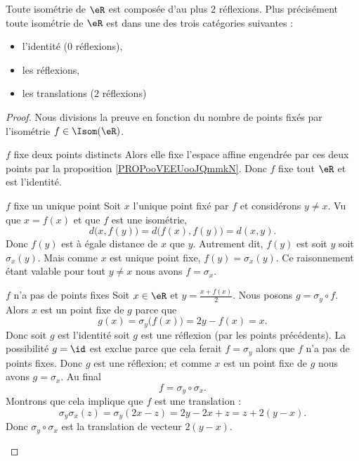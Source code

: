 \begin{theorem}
    Toute isométrie de \( \eR\) est composée d'au plus \( 2\) réflexions. Plus précisément toute isométrie de \( \eR\) est dans une des trois catégories suivantes :
    \begin{itemize}
        \item l'identité (\( 0\) réflexions),
        \item les réflexions,
        \item les translations (\( 2\) réflexions)
    \end{itemize}
\end{theorem}

\begin{proof}
    Nous divisions la preuve en fonction du nombre de points fixés par l'isométrie \( f\in\Isom(\eR)\).
    \begin{subproof}
        \item[\( f\) fixe deux points distincts]
            Alors elle fixe l'espace affine engendrée par ces deux points par la proposition \ref{PROPooVEEUooJQmmkN}. Donc \( f\) fixe tout \( \eR\) et est l'identité.
        \item[\( f\) fixe un unique point]
            Soit \( x\) l'unique point fixé par \( f\) et considérons \( y\neq x\). Vu que \( x=f(x)\) et que \( f\) est une isométrie,
            \begin{equation}
                d\big( x,f(y) \big)=d\big( f(x),f(y) \big)=d(x,y).
            \end{equation}
            Donc \( f(y)\) est à égale distance de \( x\) que \( y\). Autrement dit, \( f(y)\) est soit \( y\) soit \( \sigma_x(y)\). Mais comme \( x\) est unique point fixe, \( f(y)=\sigma_x(y)\). Ce raisonnement étant valable pour tout \( y\neq x  \) nous avons \( f=\sigma_x\).
        \item[\( f\) n'a pas de points fixes]
            Soit \( x\in \eR\) et \( y=\frac{ x+f(x) }{ 2 }\). Nous posons \( g=\sigma_y\circ f\). Alors \( x\) est un point fixe de \( g\) parce que
            \begin{equation}
                g(x)=\sigma_y\big( f(x) \big)=2y-f(x)=x.
            \end{equation}
            Donc soit \( g\) est l'identité soit \( g\) est une réflexion (par les points précédents). La possibilité \( g=\id\) est exclue parce que cela ferait \( f=\sigma_y\) alors que \( f\) n'a pas de points fixes. Donc \( g\) est une réflexion; et comme \( x\) est un point fixe de \( g\) nous avons \( g=\sigma_x\). Au final
            \begin{equation}
                f=\sigma_y\circ\sigma_x.
            \end{equation}
            Montrons que cela implique que \( f\) est une translation :
            \begin{equation}
                \sigma_y\sigma_x(z)=\sigma_y(2x-z)=2y-2x+z=z+2(y-x).
            \end{equation}
            Donc \( \sigma_y\circ\sigma_x\) est la translation de vecteur \( 2(y-x)\).
    \end{subproof}
\end{proof}

